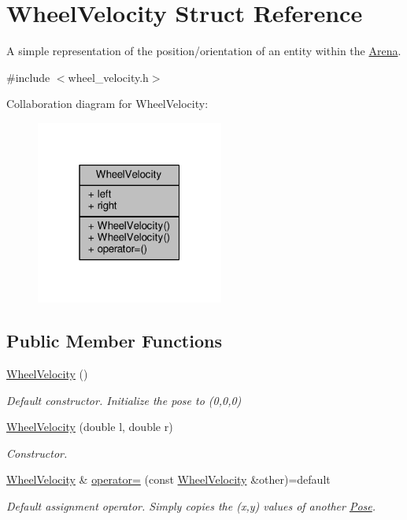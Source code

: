 \hypertarget{structWheelVelocity}{}\section{Wheel\+Velocity Struct Reference}
\label{structWheelVelocity}


A simple representation of the position/orientation of an entity within the \hyperlink{classArena}{Arena}.  




{\ttfamily \#include $<$wheel\+\_\+velocity.\+h$>$}



Collaboration diagram for Wheel\+Velocity\+:\nopagebreak
\begin{figure}[H]
\begin{center}
\leavevmode
\includegraphics[width=175pt]{structWheelVelocity__coll__graph}
\end{center}
\end{figure}
\subsection*{Public Member Functions}
\begin{DoxyCompactItemize}
\item 
\hyperlink{structWheelVelocity_a20d96cc07cac3a0ebaea27e852f262a7}{Wheel\+Velocity} ()\hypertarget{structWheelVelocity_a20d96cc07cac3a0ebaea27e852f262a7}{}\label{structWheelVelocity_a20d96cc07cac3a0ebaea27e852f262a7}

\begin{DoxyCompactList}\small\item\em Default constructor. Initialize the pose to (0,0,0) \end{DoxyCompactList}\item 
\hyperlink{structWheelVelocity_a08a753191ddcffb83592d60e4e46be65}{Wheel\+Velocity} (double l, double r)
\begin{DoxyCompactList}\small\item\em Constructor. \end{DoxyCompactList}\item 
\hyperlink{structWheelVelocity}{Wheel\+Velocity} \& \hyperlink{structWheelVelocity_a43eee436deaaa5fb6e0d747c2cc4d266}{operator=} (const \hyperlink{structWheelVelocity}{Wheel\+Velocity} \&other)=default
\begin{DoxyCompactList}\small\item\em Default assignment operator. Simply copies the (x,y) values of another \hyperlink{structPose}{Pose}. \end{DoxyCompactList}\end{DoxyCompactItemize}
